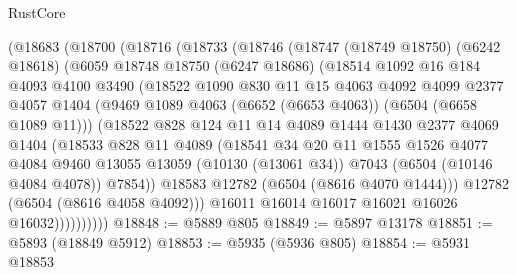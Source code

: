 \begin{lexlean}{RustCore}
\begin{coremodule}
        (@18683
          (@18700
            (@18716
              (@18733
                (@18746
                  (@18747
                    (@18749 @18750)
                    (@6242 @18618)
                    (@6059
                      @18748
                      @18750
                      (@6247 @18686)
                      (@18514
                        @1092
                        @16
                        @184
                        @4093
                        @4100
                        @3490
                        (@18522
                          @1090
                          @830
                          @11
                          @15
                          @4063
                          @4092
                          @4099
                          @2377
                          @4057
                          @1404
                          (@9469 @1089 @4063 (@6652 (@6653 @4063)) (@6504 (@6658 @1089 @11)))
                          (@18522
                            @828
                            @124
                            @11
                            @14
                            @4089
                            @1444
                            @1430
                            @2377
                            @4069
                            @1404
                            (@18533
                              @828
                              @11
                              @4089
                              (@18541
                                @34
                                @20
                                @11
                                @1555
                                @1526
                                @4077
                                @4084
                                @9460
                                @13055
                                @13059
                                (@10130 (@13061 @34))
                                @7043
                                (@6504 (@10146 @4084 @4078))
                                @7854))
                            @18583
                            @12782
                            (@6504 (@8616 @4070 @1444)))
                          @12782
                          (@6504 (@8616 @4058 @4092)))
                        @16011
                        @16014
                        @16017
                        @16021
                        @16026
                        @16032))))))))))
@18848 := @5889 @805
@18849 := @5897 @13178
@18851 := @5893 (@18849 @5912)
@18853 := @5935 (@5936 @805)
@18854 := @5931 @18853

\end{coremodule}
\end{lexlean}
